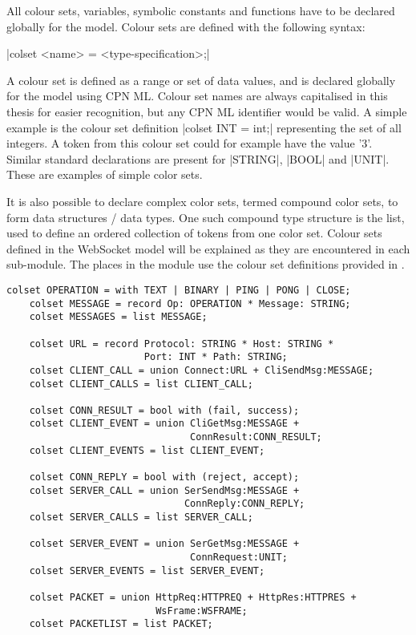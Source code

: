 	All colour sets, variables, symbolic constants and functions have to be
	declared globally for the model. Colour sets are defined with the following syntax:
	
	|colset <name> = <type-specification>;|
	
	A colour set is defined as a range or set of data
	values, and is declared globally for the model using CPN ML. Colour set names
	are always capitalised in this thesis for easier recognition, but any CPN ML
	identifier would be valid.
	A simple example is the colour set definition |colset INT = int;| representing
	the set of all integers.
	A token from this colour set could for example have the value '3'. Similar
	standard declarations are present for |STRING|, |BOOL| and |UNIT|.
	These are examples of simple color sets. 
	
	It is also possible to declare complex color sets, termed compound color
	sets, to form data structures / data types. One such compound type structure is
	the list, used to define an ordered collection of tokens from one color set.
	Colour sets defined in the WebSocket model will be explained as they are
	encountered in each sub-module. The places in the  module
	use the colour set definitions provided in .
	
	\begin{lstlisting}[label=lst:overview_colset,caption=Overview colour
	sets,gobble=1,tabsize=4,float=tbh] 
	colset OPERATION = with TEXT | BINARY | PING | PONG | CLOSE; 
	colset MESSAGE = record Op: OPERATION *	Message: STRING;
	colset MESSAGES = list MESSAGE;
	
	colset URL = record Protocol: STRING * Host: STRING * 
						Port: INT * Path: STRING;
	colset CLIENT_CALL = union Connect:URL + CliSendMsg:MESSAGE;
	colset CLIENT_CALLS = list CLIENT_CALL;
	
	colset CONN_RESULT = bool with (fail, success);
	colset CLIENT_EVENT = union CliGetMsg:MESSAGE + 
								ConnResult:CONN_RESULT;
	colset CLIENT_EVENTS = list CLIENT_EVENT;
	
	colset CONN_REPLY = bool with (reject, accept);
	colset SERVER_CALL = union SerSendMsg:MESSAGE + 
							   ConnReply:CONN_REPLY;
	colset SERVER_CALLS = list SERVER_CALL;
	
	colset SERVER_EVENT = union SerGetMsg:MESSAGE + 
								ConnRequest:UNIT;
	colset SERVER_EVENTS = list SERVER_EVENT;
	
	colset PACKET = union HttpReq:HTTPREQ + HttpRes:HTTPRES + 
						  WsFrame:WSFRAME;
	colset PACKETLIST = list PACKET;
	\end{lstlisting}
	
